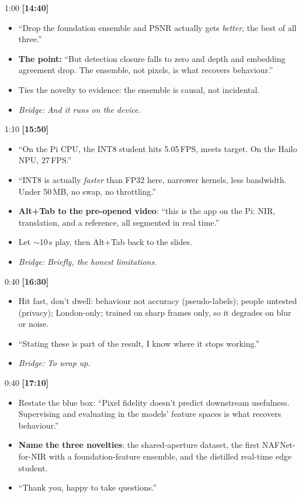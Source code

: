 \documentclass[11pt]{article}
\newcommand{\slidehd}[3]{%
  \vspace{6pt}\noindent{\bfseries\textcolor{ICLBlue}{#1}}%
  \hfill{\small #2 \quad\textbf{[#3]}}\\[1pt]}
\newcommand{\bridge}[1]{\textit{\textcolor{ICLBlue}{Bridge:}} \textit{#1}}
\begin{document}
\slidehd{14. What drives it: the ablation}{1:00}{14:40}
\begin{itemize}
	\item ``Drop the foundation ensemble and PSNR actually gets \emph{better}, the best of all three.''
	\item \textcolor{Hi}{\textbf{The point:}} ``But detection closure falls to zero and depth and embedding agreement drop. The ensemble, not pixels, is what recovers behaviour.''
	\item Ties the novelty to evidence: the ensemble is causal, not incidental.
	\item \bridge{And it runs on the device.}
\end{itemize}

\slidehd{15. Edge + live demo}{1:10}{15:50}
\begin{itemize}
	\item ``On the Pi CPU, the INT8 student hits 5.05\,FPS, meets target. On the Hailo NPU, 27\,FPS.''
	\item ``INT8 is actually \emph{faster} than FP32 here, narrower kernels, less bandwidth. Under 50\,MB, no swap, no throttling.''
	\item \textcolor{Hi}{\textbf{Alt+Tab to the pre-opened video}}: ``this is the app on the Pi: NIR, translation, and a reference, all segmented in real time.''
	\item Let $\sim$10\,s play, then Alt+Tab back to the slides.
	\item \bridge{Briefly, the honest limitations.}
\end{itemize}

\slidehd{16. Limitations}{0:40}{16:30}
\begin{itemize}
	\item Hit fast, don't dwell: behaviour not accuracy (pseudo-labels); people untested (privacy); London-only; trained on sharp frames only, so it degrades on blur or noise.
	\item ``Stating these is part of the result, I know where it stops working.''
	\item \bridge{To wrap up.}
\end{itemize}

\slidehd{17. Conclusion}{0:40}{17:10}
\begin{itemize}
	\item Restate the blue box: ``Pixel fidelity doesn't predict downstream usefulness. Supervising and evaluating in the models' feature spaces is what recovers behaviour.''
	\item \textcolor{Hi}{\textbf{Name the three novelties}}: the shared-aperture dataset, the first NAFNet-for-NIR with a foundation-feature ensemble, and the distilled real-time edge student.
	\item ``Thank you, happy to take questions.''
\end{itemize}
\end{document}
